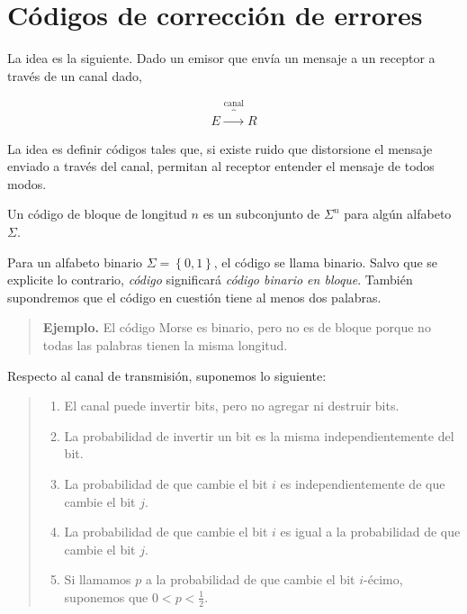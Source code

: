 \documentclass[a4paper]{article}
\begin{document}
\pagebreak

\section{Códigos de corrección de errores}

La idea es la siguiente. Dado un emisor que envía un mensaje a un receptor a través de un canal dado, 

\begin{align*}
    E \overbrace{\longrightarrow}^{\text{canal}} R
\end{align*}

La idea es definir códigos tales que, si existe ruido que distorsione el
mensaje enviado a través del canal, permitan al receptor entender el mensaje de
todos modos.

\begin{definition}
    Un código de bloque de longitud $n$ es un subconjunto de $\Sigma^n$ para algún alfabeto $\Sigma$. 
\end{definition}

Para un alfabeto binario $\Sigma = \left\{ 0, 1 \right\} $, el código se llama
binario. Salvo que se explicite lo contrario, \textit{código} significará
\textit{código binario en bloque}. También supondremos que el código en
cuestión tiene al menos dos palabras.


\small
\begin{quote}

\textbf{Ejemplo.} El código Morse es binario, pero no es de bloque porque no todas las palabras
tienen la misma longitud.

\end{quote}
\normalsize

Respecto al canal de transmisión, suponemos lo siguiente: 


\small
\begin{quote}

\begin{enumerate}
    \item El canal puede invertir bits, pero no agregar ni destruir bits. 
    \item La probabilidad de invertir un bit es la misma independientemente del bit.
    \item La probabilidad de que cambie el bit $i$ es independientemente de que 
        cambie el bit $j$.
    \item La probabilidad de que cambie el bit $i$ es igual a la probabilidad de que 
        cambie el bit $j$.
    \item Si llamamos $p$ a la probabilidad de que cambie el bit $i$-écimo, suponemos 
        que $0 < p < \frac{1}{2}$.
\end{enumerate}

\end{quote}
\normalsize
\end{document}
